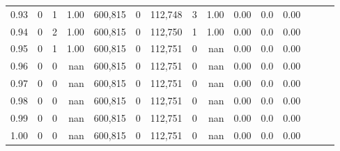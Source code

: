 \begin{tabular}{rrrrrrrrrrrrrrr}
0.93 &       0 &      1 &  1.00 &  600,815 &        0 &  112,748 &        3 &  1.00 &  0.00 &                     0.0 &      0.00 \\
0.94 &       0 &      2 &  1.00 &  600,815 &        0 &  112,750 &        1 &  1.00 &  0.00 &                     0.0 &      0.00 \\
0.95 &       0 &      1 &  1.00 &  600,815 &        0 &  112,751 &        0 &   nan &  0.00 &                     0.0 &      0.00 \\
0.96 &       0 &      0 &   nan &  600,815 &        0 &  112,751 &        0 &   nan &  0.00 &                     0.0 &      0.00 \\
0.97 &       0 &      0 &   nan &  600,815 &        0 &  112,751 &        0 &   nan &  0.00 &                     0.0 &      0.00 \\
0.98 &       0 &      0 &   nan &  600,815 &        0 &  112,751 &        0 &   nan &  0.00 &                     0.0 &      0.00 \\
0.99 &       0 &      0 &   nan &  600,815 &        0 &  112,751 &        0 &   nan &  0.00 &                     0.0 &      0.00 \\
1.00 &       0 &      0 &   nan &  600,815 &        0 &  112,751 &        0 &   nan &  0.00 &                     0.0 &      0.00 \\
\bottomrule
\end{tabular}
